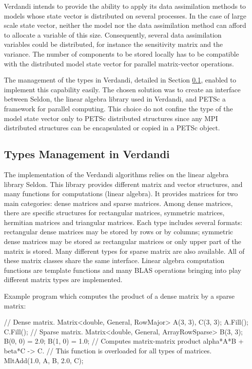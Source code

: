 Verdandi intends to provide the ability to apply its data assimilation methods to models whose state vector is distributed on several processes. In the case of large scale state vector, neither the model nor the data assimilation method can afford to allocate a variable of this size. Consequently, several data assimilation variables
could be distributed, for instance the sensitivity matrix and the variance. The number of components to be stored locally has to be compatible with the distributed model state vector for parallel matrix-vector operations.

The management of the types in Verdandi, detailed in Section \ref{seq-par-type}, enabled to implement this capability easily. The chosen solution was to create an interface between Seldon, the linear algebra library used in Verdandi, and PETSc a framework for parallel computing. This choice do not confine the type of the model state vector only to PETSc distributed structures since any MPI distributed structures can be encapsulated or copied in a PETSc object.


\hypertarget{seq-par-type}{}\subsection{Types Management in Verdandi}\label{seq-par-type}


The implementation of the Verdandi algorithms relies on the linear algebra library Seldon. This library provides different matrix and vector structures, and many functions for computations (linear algebra). It provides matrices for two main categories: dense matrices and sparse matrices. Among dense matrices, there are specific structures for rectangular matrices, symmetric matrices, hermitian matrices and triangular matrices. Each type includes several formats: rectangular dense matrices may be stored by rows or by columns; symmetric dense matrices may be stored as rectangular matrices or only upper part of the matrix is stored. Many different types
for sparse matrix are also available. All  of these matrix classes share the same interface. Linear algebra computation functions are template functions and many BLAS operations bringing into play different matrix types are implemented.


Example program which computes the product of a dense matrix by a sparse matrix:


\begin{frame_cpp}
// Dense  matrix.
Matrix<double, General, RowMajor> A(3, 3), C(3, 3);
A.Fill();
C.Fill();
// Sparse matrix.
Matrix<double, General, ArrayRowSparse> B(3, 3);
B(0, 0) = 2.0;
B(1, 0) = 1.0;
// Computes matrix-matrix product alpha*A*B + beta*C -> C.
// This function is overloaded for all types of matrices.
MltAdd(1.0, A, B, 2.0, C);
\end{frame_cpp}


